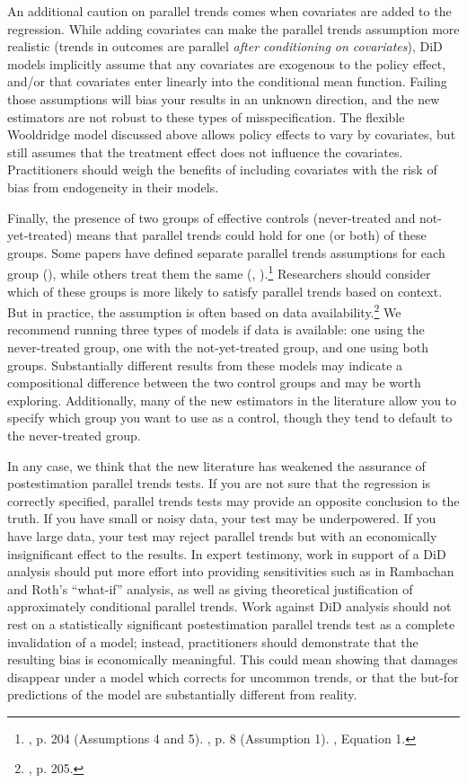 \documentclass[12pt]{article}
\begin{document}
An additional caution on parallel trends comes when covariates are added to the regression. While adding covariates can make the parallel trends assumption more realistic (trends in outcomes are parallel \textit{after conditioning on covariates}), DiD models implicitly assume that any covariates are exogenous to the policy effect, and/or that covariates enter linearly into the conditional mean function. Failing those assumptions will bias your results in an unknown direction, and the new estimators are not robust to these types of misspecification. The flexible Wooldridge model discussed above allows policy effects to vary by covariates, but still assumes that the treatment effect does not influence the covariates. Practitioners should weigh the benefits of including covariates with the risk of bias from endogeneity in their models.

Finally, the presence of two groups of effective controls (never-treated and not-yet-treated) means that parallel trends could hold for one (or both) of these groups. Some papers have defined separate parallel trends assumptions for each group (\citet{CS2021}), while others treat them the same (\citet{borusyak2024revisiting}, \citet{gardner2022a}).\footnote{\citet{CS2021}, p. 204 (Assumptions 4 and 5). \citet{borusyak2024revisiting}, p. 8 (Assumption 1). \citet{gardner2022a}, Equation 1.}  Researchers should consider which of these groups is more likely to satisfy parallel trends based on context. But in practice, the assumption is often based on data availability.\footnote{\citet{CS2021}, p. 205.}  We recommend running three types of models if data is available: one using the never-treated group, one with the not-yet-treated group, and one using both groups. Substantially different results from these models may indicate a compositional difference between the two control groups and may be worth exploring. Additionally, many of the new estimators in the literature allow you to specify which group you want to use as a control, though they tend to default to the never-treated group.

In any case, we think that the new literature has weakened the assurance of postestimation parallel trends tests. If you are not sure that the regression is correctly specified, parallel trends tests may provide an opposite conclusion to the truth. If you have small or noisy data, your test may be underpowered. If you have large data, your test may reject parallel trends but with an economically insignificant effect to the results. In expert testimony, work in support of a DiD analysis should put more effort into providing sensitivities such as in Rambachan and Roth’s “what-if” analysis, as well as giving theoretical justification of approximately conditional parallel trends. Work against DiD analysis should not rest on a statistically significant postestimation parallel trends test as a complete invalidation of a model; instead, practitioners should demonstrate that the resulting bias is economically meaningful. This could mean showing that damages disappear under a model which corrects for uncommon trends, or that the but-for predictions of the model are substantially different from reality.
\end{document}

